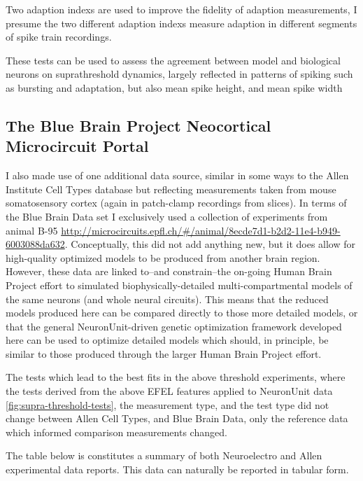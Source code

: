 Two adaption indexs are used to improve the fidelity of adaption measurements, I presume the two different adaption indexs measure adaption in different segments of spike train recordings.


These tests can be used to assess the agreement between model and biological neurons on suprathreshold dynamics, largely reflected in patterns of spiking such as bursting and adaptation, but also mean spike height, and mean spike width

\subsection{The Blue Brain Project Neocortical Microcircuit Portal}
I also made use of one additional data source, similar in some ways to the Allen Institute Cell Types database but reflecting measurements taken from mouse somatosensory cortex (again in patch-clamp recordings from slices). In terms of the Blue Brain Data set I exclusively used a collection of experiments from animal B-95 \url{http://microcircuits.epfl.ch/#/animal/8ecde7d1-b2d2-11e4-b949-6003088da632}.
Conceptually, this did not add anything new, but it does allow for high-quality optimized models to be produced from another brain region.
However, these data are linked to--and constrain--the on-going Human Brain Project effort to simulated biophysically-detailed multi-compartmental models of the same neurons (and whole neural circuits).
This means that the reduced models produced here can be compared directly to those more detailed models, or that the general NeuronUnit-driven genetic optimization framework developed here can be used to optimize detailed models which should, in principle, be similar to those produced through the larger Human Brain Project effort.

The tests which lead to the best fits in the above threshold experiments, where the tests derived from the above EFEL features applied to NeuronUnit data \ref{fig:supra-threshold-tests}, the measurement type, and the test type did not change between Allen Cell Types, and Blue Brain Data, only the reference data which informed comparison measurements changed.



The table below is constitutes a summary of both Neuroelectro and Allen experimental data reports. This data can naturally be reported in tabular form. 

